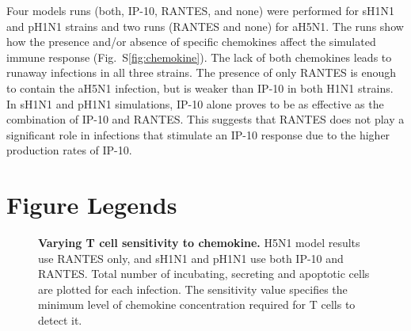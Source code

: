 \documentclass[10pt]{article}
\newcommand{\removed}[1]{{\color{dkred}\sout{#1}}}
\newcommand{\drew}[1]{{\color{dkgreen}#1}}
\newcommand{\fred}[1]{{\color{dkblue}#1}}
\begin{document}
Four models runs (both, IP-10, RANTES, and none) were performed for sH1N1 and pH1N1 strains and two runs (RANTES and none) for  aH5N1.  The runs show how the presence and/or absence of specific chemokines affect the simulated immune response (Fig.~S\ref{fig:chemokine}).  The lack of both chemokines leads to runaway infections in all three strains.  The presence of only RANTES is enough to contain the aH5N1 infection, but is weaker than IP-10 in both H1N1 strains.  In sH1N1 and pH1N1 simulations, IP-10 alone proves to be as effective as the combination of IP-10 and RANTES.  This suggests that RANTES does not play a significant role in infections that stimulate an IP-10 response due to the higher production rates of IP-10.  

%



\pagebreak

\section*{Figure Legends}



\setcounter{figure}{0}
\renewcommand{\thefigure}{S\arabic{figure}}


\begin{figure}[!ht]
\begin{center}
 \end{center}
\caption{{\bf Varying T cell sensitivity to chemokine.}  H5N1 model results use RANTES  only, and sH1N1 and pH1N1 use both IP-10 and RANTES. Total number of incubating, secreting and apoptotic cells are plotted for each infection.  The sensitivity value specifies the minimum level of chemokine concentration required for T cells to detect it. } 
 \label{fig:sensitivity}
\end{figure}
\end{document}

